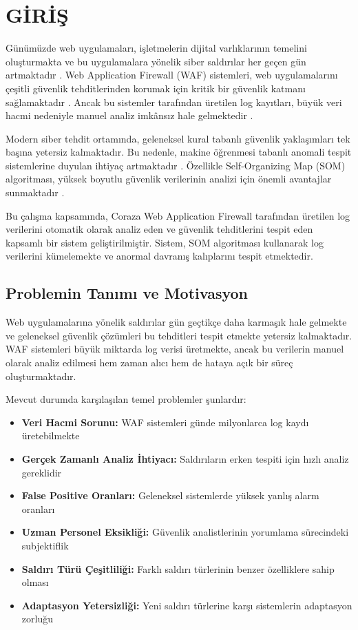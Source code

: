 \section{GİRİŞ}

Günümüzde web uygulamaları, işletmelerin dijital varlıklarının temelini oluşturmakta ve bu uygulamalara yönelik siber saldırılar her geçen gün artmaktadır \cite{web_attacks_taxonomy2020}. Web Application Firewall (WAF) sistemleri, web uygulamalarını çeşitli güvenlik tehditlerinden korumak için kritik bir güvenlik katmanı sağlamaktadır \cite{waf_security2022}. Ancak bu sistemler tarafından üretilen log kayıtları, büyük veri hacmi nedeniyle manuel analiz imkânsız hale gelmektedir \cite{log_analysis_ml2020}.

Modern siber tehdit ortamında, geleneksel kural tabanlı güvenlik yaklaşımları tek başına yetersiz kalmaktadır. Bu nedenle, makine öğrenmesi tabanlı anomali tespit sistemlerine duyulan ihtiyaç artmaktadır \cite{chandola2009anomaly}. Özellikle Self-Organizing Map (SOM) algoritması, yüksek boyutlu güvenlik verilerinin analizi için önemli avantajlar sunmaktadır \cite{som_cybersecurity2021}.

Bu çalışma kapsamında, Coraza Web Application Firewall \cite{coraza2023} tarafından üretilen log verilerini otomatik olarak analiz eden ve güvenlik tehditlerini tespit eden kapsamlı bir sistem geliştirilmiştir. Sistem, SOM algoritması \cite{kohonen2001self,som_algoritmasi2020} kullanarak log verilerini kümelemekte ve anormal davranış kalıplarını tespit etmektedir.

\subsection{Problemin Tanımı ve Motivasyon}

Web uygulamalarına yönelik saldırılar gün geçtikçe daha karmaşık hale gelmekte ve geleneksel güvenlik çözümleri bu tehditleri tespit etmekte yetersiz kalmaktadır. WAF sistemleri büyük miktarda log verisi üretmekte, ancak bu verilerin manuel olarak analiz edilmesi hem zaman alıcı hem de hataya açık bir süreç oluşturmaktadır.

Mevcut durumda karşılaşılan temel problemler şunlardır:

\begin{itemize}
    \item \textbf{Veri Hacmi Sorunu:} WAF sistemleri günde milyonlarca log kaydı üretebilmekte
    \item \textbf{Gerçek Zamanlı Analiz İhtiyacı:} Saldırıların erken tespiti için hızlı analiz gereklidir
    \item \textbf{False Positive Oranları:} Geleneksel sistemlerde yüksek yanlış alarm oranları
    \item \textbf{Uzman Personel Eksikliği:} Güvenlik analistlerinin yorumlama sürecindeki subjektiflik
    \item \textbf{Saldırı Türü Çeşitliliği:} Farklı saldırı türlerinin benzer özelliklere sahip olması
    \item \textbf{Adaptasyon Yetersizliği:} Yeni saldırı türlerine karşı sistemlerin adaptasyon zorluğu
\end{itemize}

